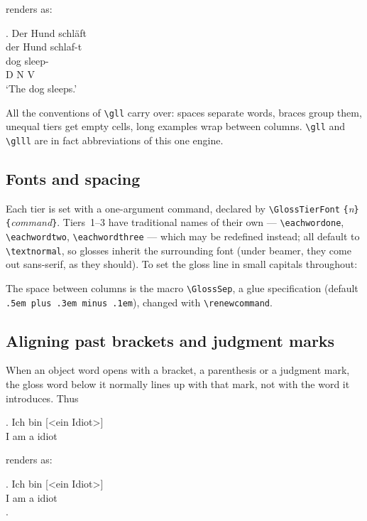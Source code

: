 \documentclass[11pt,a4paper]{article}
\newcommand{\cs}[1]{\texttt{\textbackslash #1}}
\newcommand{\pkg}[2][]{\textsf{#2}}
\newcommand{\meta}[1]{\textrm{\itshape\textlangle#1\textrangle}}
\newcommand{\marg}[1]{\penalty300 \texttt{\{}\meta{#1}\texttt{\}}}
\newcommand{\rendered}{\par\medskip\noindent\textcolor{gray!70}{\small renders as:}\par\nobreak\smallskip}
\newcommand{\afterex}{\par\addvspace{\medskipamount}}
\begin{document}
\rendered
{%
\ex. \gl Der Hund schläft \\
     der Hund schlaf-t \\
      dog sleep- \\
     D N V \\ \endgl
\glt `The dog sleeps.'

}

\afterex
All the conventions of \cs{gll} carry over: spaces separate words, braces
group them, unequal tiers get empty cells, long examples wrap between
columns. \cs{gll} and \cs{glll} are in fact abbreviations of this one
engine.

\subsection{Fonts and spacing}

Each tier is set with a one-argument command, declared by
\cs{GlossTierFont}\marg{n}\marg{command}. Tiers~1--3 have traditional
names of their own --- \cs{eachwordone}, \cs{eachwordtwo},
\cs{eachwordthree} --- which may be redefined instead; all default to
\cs{textnormal}, so glosses inherit the surrounding font (under
\pkg{beamer}, they come out sans-serif, as they should). To set the gloss
line in small capitals throughout:

\begin{code}
\renewcommand{\eachwordtwo}[1]{\textsc{#1}}
\end{code}

\noindent The space between columns is the macro \cs{GlossSep}, a glue
specification (default \texttt{.5em plus .3em minus .1em}), changed with
\cs{renewcommand}.

\subsection{Aligning past brackets and judgment marks}\label{sec:phantomalign}
When an object word opens with a bracket, a parenthesis or a judgment mark,
the gloss word below it normally lines up with that mark, not with the word
it introduces. Thus

\begin{code}
\ex. \gll Ich bin [<ein Idiot>]\\
I am a idiot\\
\end{code}

\noindent{}renders as:

\ex. \gll Ich bin [<ein Idiot>]\\ I am a idiot\\
\z.
\end{document}
